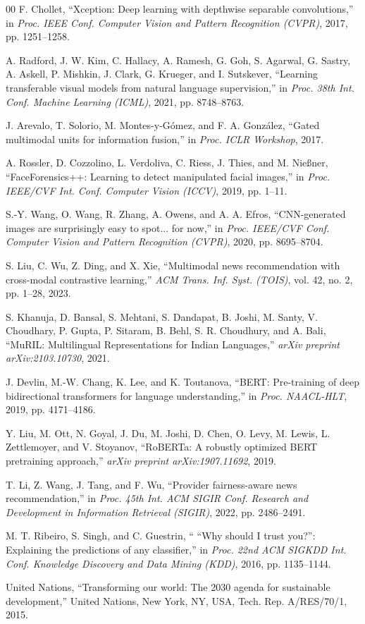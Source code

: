 \documentclass[conference]{IEEEtran}
\begin{document}
\begin{thebibliography}{00}
 F. Chollet, ``Xception: Deep learning with depthwise separable convolutions,'' in \emph{Proc. IEEE Conf. Computer Vision and Pattern Recognition (CVPR)}, 2017, pp. 1251--1258.

 A. Radford, J. W. Kim, C. Hallacy, A. Ramesh, G. Goh, S. Agarwal, G. Sastry, A. Askell, P. Mishkin, J. Clark, G. Krueger, and I. Sutskever, ``Learning transferable visual models from natural language supervision,'' in \emph{Proc. 38th Int. Conf. Machine Learning (ICML)}, 2021, pp. 8748--8763.

 J. Arevalo, T. Solorio, M. Montes-y-G\'{o}mez, and F. A. Gonz\'{a}lez, ``Gated multimodal units for information fusion,'' in \emph{Proc. ICLR Workshop}, 2017.

 A. Rossler, D. Cozzolino, L. Verdoliva, C. Riess, J. Thies, and M. Nie{\ss}ner, ``FaceForensics++: Learning to detect manipulated facial images,'' in \emph{Proc. IEEE/CVF Int. Conf. Computer Vision (ICCV)}, 2019, pp. 1--11.

 S.-Y. Wang, O. Wang, R. Zhang, A. Owens, and A. A. Efros, ``CNN-generated images are surprisingly easy to spot... for now,'' in \emph{Proc. IEEE/CVF Conf. Computer Vision and Pattern Recognition (CVPR)}, 2020, pp. 8695--8704.

 S. Liu, C. Wu, Z. Ding, and X. Xie, ``Multimodal news recommendation with cross-modal contrastive learning,'' \emph{ACM Trans. Inf. Syst. (TOIS)}, vol. 42, no. 2, pp. 1--28, 2023.

 S. Khanuja, D. Bansal, S. Mehtani, S. Dandapat, B. Joshi, M. Santy, V. Choudhary, P. Gupta, P. Sitaram, B. Behl, S. R. Choudhury, and A. Bali, ``MuRIL: Multilingual Representations for Indian Languages,'' \emph{arXiv preprint arXiv:2103.10730}, 2021.

 J. Devlin, M.-W. Chang, K. Lee, and K. Toutanova, ``BERT: Pre-training of deep bidirectional transformers for language understanding,'' in \emph{Proc. NAACL-HLT}, 2019, pp. 4171--4186.

 Y. Liu, M. Ott, N. Goyal, J. Du, M. Joshi, D. Chen, O. Levy, M. Lewis, L. Zettlemoyer, and V. Stoyanov, ``RoBERTa: A robustly optimized BERT pretraining approach,'' \emph{arXiv preprint arXiv:1907.11692}, 2019.

 T. Li, Z. Wang, J. Tang, and F. Wu, ``Provider fairness-aware news recommendation,'' in \emph{Proc. 45th Int. ACM SIGIR Conf. Research and Development in Information Retrieval (SIGIR)}, 2022, pp. 2486--2491.

 M. T. Ribeiro, S. Singh, and C. Guestrin, `` ``Why should I trust you?'': Explaining the predictions of any classifier,'' in \emph{Proc. 22nd ACM SIGKDD Int. Conf. Knowledge Discovery and Data Mining (KDD)}, 2016, pp. 1135--1144.

 United Nations, ``Transforming our world: The 2030 agenda for sustainable development,'' United Nations, New York, NY, USA, Tech. Rep. A/RES/70/1, 2015.

\end{thebibliography}
\end{document}
